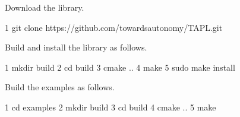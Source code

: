 \begin{DoxyItemize}
\item Download the library.
\end{DoxyItemize}


\begin{DoxyCode}
1 git clone https://github.com/towardsautonomy/TAPL.git
\end{DoxyCode}



\begin{DoxyItemize}
\item Build and install the library as follows.
\end{DoxyItemize}


\begin{DoxyCode}
1 mkdir build  
2 cd build
3 cmake ..
4 make
5 sudo make install
\end{DoxyCode}



\begin{DoxyItemize}
\item Build the examples as follows.
\end{DoxyItemize}


\begin{DoxyCode}
1 cd examples
2 mkdir build
3 cd build
4 cmake ..
5 make
\end{DoxyCode}
 